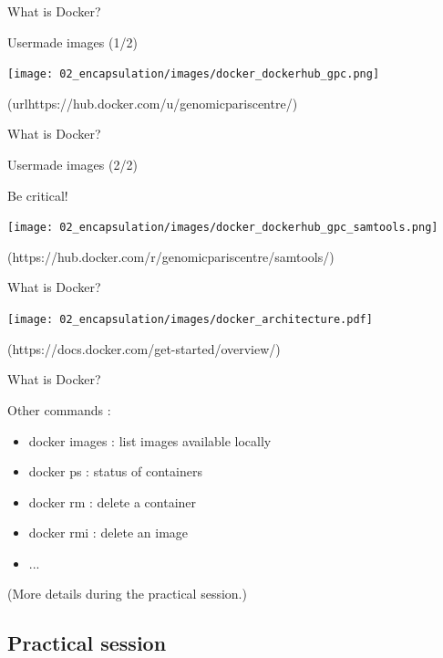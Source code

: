 \begin{frame}{What is Docker?}

Usermade images (1/2)

\centering\texttt{[image: 02\_encapsulation/images/docker\_dockerhub\_gpc.png]}

(url{https://hub.docker.com/u/genomicpariscentre/})
\end{frame}

\begin{frame}{What is Docker?}

Usermade images (2/2)

Be critical!

\centering\texttt{[image: 02\_encapsulation/images/docker\_dockerhub\_gpc\_samtools.png]}

(https://hub.docker.com/r/genomicpariscentre/samtools/)
\end{frame}

\begin{frame}{What is Docker?}

\centering\texttt{[image: 02\_encapsulation/images/docker\_architecture.pdf]}

(https://docs.docker.com/get-started/overview/)
\end{frame}

\begin{frame}{What is Docker?}

Other commands :

\begin{itemize}
  \item docker images : list images available locally
  \item docker ps : status of containers
  \item docker rm : delete a container
  \item docker rmi : delete an image
  \item ...
\end{itemize}

(More details during the practical session.)

\end{frame}


\subsection{Practical session}

